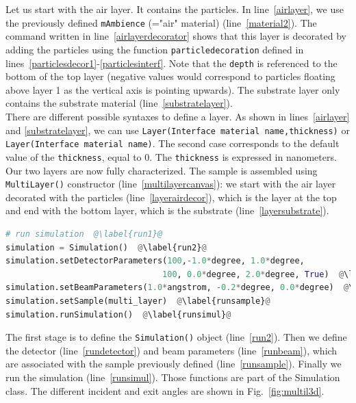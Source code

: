 \noindent Let us start with the air layer. It contains the particles. In
line~\ref{airlayer}, we use the previously defined \texttt{mAmbience}
(="air" material) (line~\ref{material2}). The command written in line~\ref{airlayerdecorator} shows that this layer is decorated by adding the
particles using the function \texttt{particledecoration} defined in
lines~\ref{particlesdecor1}-\ref{particlesinterf}. Note that the
\texttt{depth} is referenced to the bottom of the top layer (negative
values would correspond to particles floating above layer 1 as
the vertical axis is pointing upwards). The substrate layer
only contains the substrate material (line~\ref{substratelayer}).\\
 
\noindent There are different possible syntaxes to define a layer. As shown in
lines~\ref{airlayer} and \ref{substratelayer}, we can use
\texttt{Layer(Interface material name,thickness)} or
\texttt{Layer(Interface material name)}. The second case corresponds
to the default value of the \texttt{thickness}, equal to 0. The \texttt{thickness} is
expressed in  nanometers. \\

\noindent Our two layers are now fully characterized. The sample is assembled using
\texttt{MultiLayer()} constructor (line~\ref{multilayercanvas}): we start with the air layer decorated
with the particles (line~\ref{layerairdecor}), which is the layer at
the top and end with the bottom layer, which is the
substrate (line~\ref{layersubstrate}).


\begin{lstlisting}[language=python, style=eclipseboxed,name=ex1,nolol]
# run simulation  @\label{run1}@
simulation = Simulation()  @\label{run2}@
simulation.setDetectorParameters(100,-1.0*degree, 1.0*degree, 
                                100, 0.0*degree, 2.0*degree, True)  @\label{rundetector}@
simulation.setBeamParameters(1.0*angstrom, -0.2*degree, 0.0*degree)  @\label{runbeam}@
simulation.setSample(multi_layer)  @\label{runsample}@
simulation.runSimulation()  @\label{runsimul}@
\end{lstlisting}


\noindent The first stage is to define the \texttt{Simulation()} object (line~\ref{run2}). Then we define the detector (line~\ref{rundetector}) and beam
parameters (line~\ref{runbeam}), which are associated with the
sample previously defined (line~\ref{runsample}). Finally we run
the simulation (line~\ref{runsimul}). Those functions are part of the Simulation
class.  The
different incident and exit angles are
shown in Fig.~\ref{fig:multil3d}. \\

